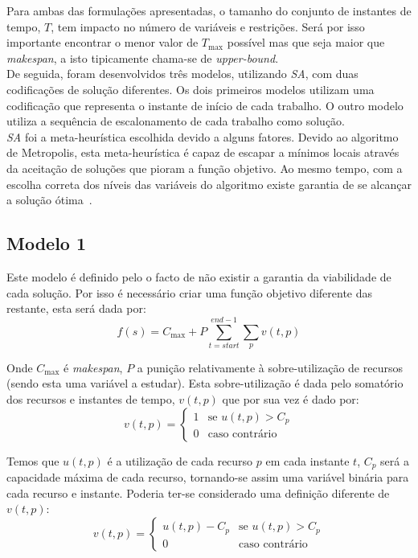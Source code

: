 Para ambas das formulações apresentadas, o tamanho do conjunto de instantes de tempo, $T$, tem impacto no número de variáveis e restrições. Será por isso importante encontrar o menor valor de $T_{\max}$ possível mas que seja maior que \textit{makespan}, a isto tipicamente chama-se de \textit{upper-bound}.\\ 

De seguida, foram desenvolvidos três modelos, utilizando \textit{SA}, com duas codificações de solução diferentes. Os dois primeiros modelos utilizam uma codificação que representa o instante de início de cada trabalho. O outro modelo utiliza a sequência de escalonamento de cada trabalho como solução.\\

\textit{SA} foi a meta-heurística escolhida devido a alguns fatores. Devido ao algoritmo de Metropolis, esta meta-heurística é capaz de escapar a mínimos locais através da aceitação de soluções que pioram a função objetivo. Ao mesmo tempo, com a escolha correta dos níveis das variáveis do algoritmo existe garantia de se alcançar a solução ótima~\cite{delahayeSimulatedAnnealingBasics2019}.\\

\subsection{Modelo 1}

Este modelo é definido pelo o facto de não existir a garantia da viabilidade de cada solução. Por isso é necessário criar uma função objetivo diferente das restante, esta será dada por:
$$f(s) = C_{\max} + P \sum_{t=start}^{end-1}\sum_{p}v(t,p)$$

Onde $C_{\max}$ é \textit{makespan}, $P$ a punição relativamente à sobre-utilização de recursos (sendo esta uma variável a estudar). Esta sobre-utilização é dada pelo somatório dos recursos e instantes de tempo, $v(t,p)$ que por sua vez é dado por:
$$
v(t,p)=
\begin{cases}
	1 & \text{se } u(t,p)>C_{p}\\
	0 & \text{caso contrário}
\end{cases}
$$

Temos que $u(t,p)$ é a utilização de cada recurso $p$ em cada instante $t$, $C_{p}$ será a capacidade máxima de cada recurso, tornando-se assim uma variável binária para cada recurso e instante. Poderia ter-se considerado uma definição diferente de $v(t,p)$:
$$
v(t,p)=
\begin{cases}
	u(t,p)-C_{p} & \text{se } u(t,p)>C_{p}\\
	0            & \text{caso contrário}
\end{cases}
$$


